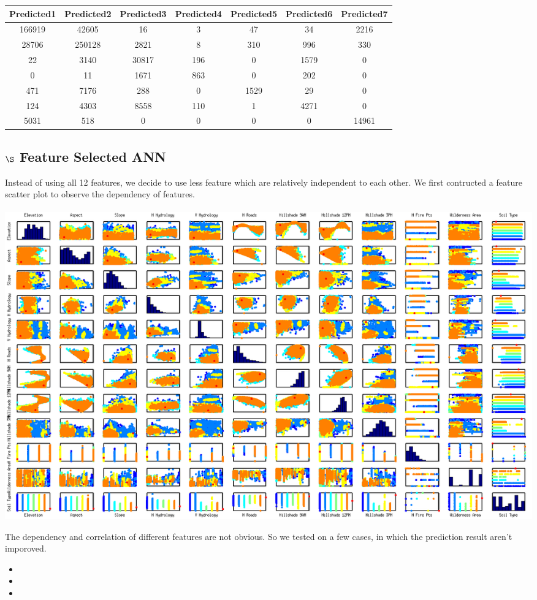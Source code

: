 \documentclass[11pt]{article}  %
\begin{document}
\begin{itemize}
\begin{table} [h]
\begin{tabular}{c c c c c c c}
\hline\hline %
Predicted1 & Predicted2 & Predicted3 & Predicted4 & Predicted5 & Predicted6& Predicted7 \\ [0.5ex] 
\hline %
166919 & 42605 & 16 & 3 & 47 & 34 & 2216 \\
28706 & 250128 & 2821 & 8 & 310 & 996 & 330 \\
22 & 3140 & 30817 & 196 & 0 & 1579 & 0 \\
0 & 11 & 1671 & 863 & 0 & 202 & 0 \\
471 & 7176 & 288 & 0 & 1529 & 29 & 0 \\
124 & 4303 & 8558 & 110 & 1 & 4271 & 0 \\
5031 & 518 & 0 & 0 & 0 & 0 & 14961 \\
\hline %
\end{tabular}
\end{table}


\end{itemize}

\subsection*{$\S$ Feature Selected ANN}
Instead of using all 12 features, we decide to use less feature which are relatively independent to each other. We first contructed a feature scatter plot to observe the dependency of features.\\
\\
\includegraphics[scale=0.4]{featureScatterPlotMatrixHD}


The dependency and correlation of different features are not obvious. So we tested on a few cases, in which the prediction result aren't imporoved.

\begin{itemize}
\item 
\item 
\item 


\end{itemize}
\end{document}
